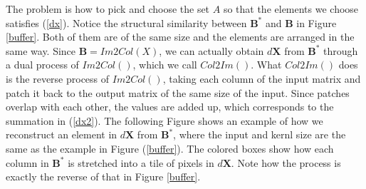 \documentclass[authordraft=true,dvipsnames]{acmart}
\newcommand{\pref}[1]{(\ref{#1})}
\newcommand{\bx}[0]{\mathbf{X}}
\newcommand{\bb}[0]{\mathbf{B}}
\begin{document}
The problem is how to pick and choose the set $A$ so that the elements we choose satisfies \pref{dx}. Notice the structural similarity between $\bb^*$ and $\mathbf{B}$ in Figure \ref{buffer}. Both of them are of the same size and the elements are arranged in the same way. Since $\mathbf{B} = Im2Col(X)$, we can actually obtain $d\bx$ from $\mathbf{B}^*$ through a dual process of $Im2Col()$, which we call $Col2Im()$. What $Col2Im()$ does is the reverse process of $Im2Col()$, taking each column of the input matrix and patch it back to the output matrix of the same size of the input. Since patches overlap with each other, the values are added up, which corresponds to the summation in \pref{dx2}. The following Figure shows an example of how we reconstruct an element in $d\mathbf{X}$ from $\mathbf{B}^*$, where the input and kernl size are the same as the example in Figure \pref{buffer}. The colored boxes show how each column in $\mathbf{B}^*$ is stretched into a tile of pixels in $d\bx$. Note how the process is exactly the reverse of that in Figure \ref{buffer}.
\end{document}
